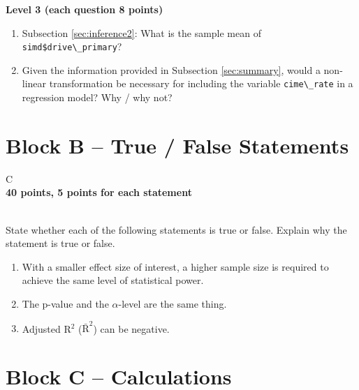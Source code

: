 \documentclass[12pt,a4paper]{article}
\makeatletter
\newcommand{\passthrough}[1]{#1}
\renewenvironment{table}[1][]{%
 \ifthenelse{\equal{#1}{}}{%
   \@float{table}
 }{%
   \@float{table}[#1]%
 }%
 \centering
}{%
 \end@float
}
\let\Oldlstinline\lstinline
\DeclareRobustCommand{\lstinline}[1][]{\Oldlstinline[style=InlineCode,#1]}
\providecommand{\tightlist}{%
  \setlength{\itemsep}{0pt}\setlength{\parskip}{0pt}}
\providecommand{\passthrough}[1]{#1}
\makeatother
\begin{document}
\textbf{Level 3 (each question 8 points)}

\begin{enumerate}
\def\labelenumi{\arabic{enumi}.}
\setcounter{enumi}{8}
\tightlist
\item
  Subsection \ref{sec:inference2}: What is the sample mean of
  \passthrough{\lstinline!simd$drive\_primary!}?
\item
  Given the information provided in Subsection \ref{sec:summary}, would
  a non-linear transformation be necessary for including the variable
  \passthrough{\lstinline!cime\_rate!} in a regression model? Why / why
  not?
\end{enumerate}

\newpage

\section{Block B -- True / False
Statements}\label{block-b-true-false-statements}

\begin{table}[!h]
\centering
\begin{tabularx}{\textwidth}{C}
\Xhline{3\arrayrulewidth}
\\[-1ex]
\textbf{40 points, 5 points for each statement} \\
\\[-1ex]
\Xhline{3\arrayrulewidth}
\end{tabularx}
\end{table}

\vspace{1cm}

State whether each of the following statements is true or false. Explain
why the statement is true or false.

\vspace{1em}

\begin{enumerate}
\def\labelenumi{\arabic{enumi}.}
\tightlist
\item
  With a smaller effect size of interest, a higher sample size is
  required to achieve the same level of statistical power.
\item
  The p-value and the \(\alpha\)-level are the same thing.
\item
  Adjusted R\(^2\) (\(\bar{\text{R}}^2\)) can be negative.
\end{enumerate}

\newpage

\section{Block C -- Calculations}\label{block-c-calculations}
\end{document}
